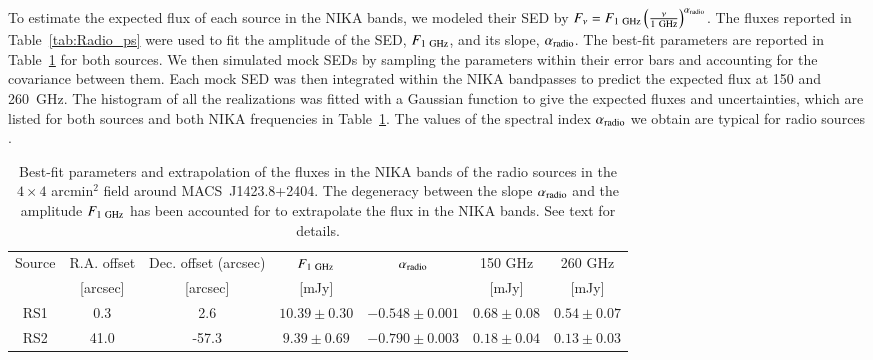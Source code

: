 \documentclass[twocolumn,traditabstract]{aa}
\begin{document}
To estimate the expected flux of each source in the NIKA bands, we modeled their SED by $F_{\nu} = F_{1 \ {\rm GHz}} \left(\frac{\nu}{1 \ {\rm GHz}}\right)^{\alpha_{\rm radio}}$. The fluxes reported in Table~\ref{tab:Radio_ps} were used to fit the amplitude of the SED, $F_{1 \ {\rm GHz}}$, and its slope, $\alpha_{\rm radio}$. The best-fit parameters are reported in Table~\ref{tab:Radio_ps2} for both sources. We then simulated mock SEDs by sampling the parameters within their error bars and accounting for the covariance between them. Each mock SED was then integrated within the NIKA bandpasses to predict the expected flux at 150 and 260~GHz. The histogram of all the realizations was fitted with a Gaussian function to give the expected fluxes and uncertainties, which are listed for both sources and both NIKA frequencies in Table~\ref{tab:Radio_ps2}. The values of the spectral index $\alpha_{\rm radio}$ we obtain are typical for radio sources \citep[see for example][]{witzel1979}.
\begin{table}[h]
\caption{\footnotesize Best-fit parameters and extrapolation of the fluxes in the NIKA bands of the radio sources in the $4 \times 4$ arcmin$^2$ field around \mbox{MACS~J1423.8+2404}. The degeneracy between the slope $\alpha_{\rm radio}$ and the amplitude $F_{1 \ {\rm GHz}}$ has been accounted for to extrapolate the flux in the NIKA bands. See text for details.}
\begin{center}
\begin{tabular}{ccccccc}
\hline
\hline
Source & R.A. offset & Dec. offset (arcsec) & $F_{1 \ {\rm GHz}}$ & $\alpha_{\rm radio}$ & 150 GHz & 260 GHz \\
 & [arcsec] & [arcsec] & [mJy] & & [mJy] & [mJy] \\
\hline
RS1 &      0.3 &      2.6 & $   10.39 \pm     0.30$ & $  -0.548 \pm    0.001$ & $    0.68 \pm     0.08$ & $    0.54 \pm     0.07$ \\
RS2 &     41.0 &    -57.3 & $    9.39 \pm     0.69$ & $  -0.790 \pm    0.003$ & $    0.18 \pm     0.04$ & $    0.13 \pm     0.03$ \\
\hline
\end{tabular}
\end{center}
\label{tab:Radio_ps2}
\end{table}
\end{document}
